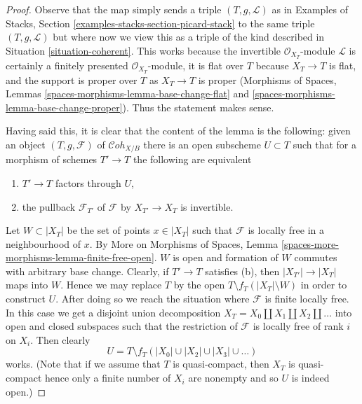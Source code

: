 \documentclass{stacks-project}
\theoremstyle{plain}
\theoremstyle{definition}
\theoremstyle{remark}
\numberwithin{equation}{subsection}
\def\Cohstack{\mathcal{C}\!\mathit{oh}}
\begin{document}
\begin{proof}
Observe that the map simply sends a triple $(T, g, \mathcal{L})$
as in Examples of Stacks, Section \ref{examples-stacks-section-picard-stack}
to the same triple $(T, g, \mathcal{L})$ but where now we view
this as a triple of the kind described in
Situation \ref{situation-coherent}.
This works because the invertible $\mathcal{O}_{X_T}$-module
$\mathcal{L}$ is certainly a finitely presented $\mathcal{O}_{X_T}$-module,
it is flat over $T$ because $X_T \to T$ is flat, and the support is
proper over $T$ as $X_T \to T$ is proper
(Morphisms of Spaces, Lemmas \ref{spaces-morphisms-lemma-base-change-flat}
and \ref{spaces-morphisms-lemma-base-change-proper}).
Thus the statement makes sense.

\medskip\noindent
Having said this, it is clear that the content of the lemma is the
following: given an object $(T, g, \mathcal{F})$ of
$\Cohstack_{X/B}$ there is an open subscheme $U \subset T$
such that for a morphism of schemes $T' \to T$ the following
are equivalent
\begin{enumerate}
\item[(a)] $T' \to T$ factors through $U$,
\item[(b)] the pullback $\mathcal{F}_{T'}$ of
$\mathcal{F}$ by $X_{T'} \to X_T$ is invertible.
\end{enumerate}
Let $W \subset |X_T|$ be the set of points $x \in |X_T|$
such that $\mathcal{F}$ is locally free in a neighbourhood of $x$. By
More on Morphisms of Spaces, Lemma
\ref{spaces-more-morphisms-lemma-finite-free-open}.
$W$ is open and formation
of $W$ commutes with arbitrary base change.
Clearly, if $T' \to T$ satisfies (b), then $|X_{T'}| \to |X_T|$
maps into $W$. Hence we may replace $T$ by the open
$T \setminus f_T(|X_T| \setminus W)$ in order
to construct $U$. After doing so we reach the situation
where $\mathcal{F}$ is finite locally free.
In this case we get a disjoint union decomposition
$X_T = X_0 \amalg X_1 \amalg X_2 \amalg \ldots$
into open and closed subspaces such that the restriction of
$\mathcal{F}$ is locally free of rank $i$ on $X_i$. Then clearly
$$
U = T \setminus f_T(|X_0| \cup |X_2| \cup |X_3| \cup \ldots )
$$
works. (Note that if we assume that $T$ is quasi-compact, then
$X_T$ is quasi-compact hence only a finite number of $X_i$
are nonempty and so $U$ is indeed open.)
\end{proof}
\end{document}

